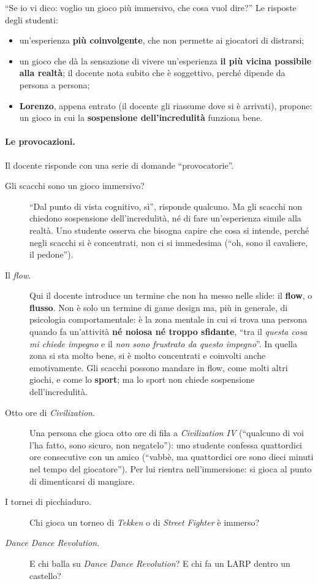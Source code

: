 ``Se io vi dico: voglio un gioco più immersivo, che cosa vuol dire?'' Le
risposte degli studenti:
\begin{itemize}
  \item un'esperienza \textbf{più coinvolgente}, che non permette ai giocatori di
        distrarsi;
  \item un gioco che dà la sensazione di vivere un'esperienza \textbf{il più
        vicina possibile alla realtà}; il docente nota subito che è soggettivo,
        perché dipende da persona a persona;
  \item \textbf{Lorenzo}, appena entrato (il docente gli riassume dove si è
        arrivati), propone: un gioco in cui la \textbf{sospensione
        dell'incredulità} funziona bene.
\end{itemize}

\paragraph{Le provocazioni.} Il docente risponde con una serie di domande
``provocatorie''.
\begin{description}
  \item[Gli scacchi sono un gioco immersivo?] ``Dal punto di vista cognitivo,
        sì'', risponde qualcuno. Ma gli scacchi non chiedono sospensione
        dell'incredulità, né di fare un'esperienza simile alla realtà. Uno
        studente osserva che bisogna capire che cosa si intende, perché negli
        scacchi si è concentrati, non ci si immedesima (``oh, sono il cavaliere,
        il pedone'').
  \item[Il \emph{flow}.] Qui il docente introduce un termine che non ha messo
        nelle slide: il \textbf{flow}, o \textbf{flusso}. Non è solo un termine
        di game design ma, più in generale, di psicologia comportamentale: è
        la zona mentale in cui si trova una persona quando fa un'attività
        \textbf{né noiosa né troppo sfidante}, ``tra il \emph{questa cosa mi chiede
        impegno} e il \emph{non sono frustrato da questo impegno}''. In quella zona
        si sta molto bene, si è molto concentrati e coinvolti anche
        emotivamente. Gli scacchi possono mandare in flow, come molti altri
        giochi, e come lo \textbf{sport}; ma lo sport non chiede sospensione
        dell'incredulità.
  \item[Otto ore di \emph{Civilization}.] Una persona che gioca otto ore di fila a
        \emph{Civilization IV} (``qualcuno di voi l'ha fatto, sono sicuro, non
        negatelo''): uno studente confessa quattordici ore consecutive con un
        amico (``vabbè, ma quattordici ore sono dieci minuti nel tempo del
        giocatore''). Per lui rientra nell'immersione: si gioca al punto di
        dimenticarsi di mangiare.
  \item[I tornei di picchiaduro.] Chi gioca un torneo di \emph{Tekken} o di
        \emph{Street Fighter} è immerso?
  \item[\emph{Dance Dance Revolution}.] E chi balla su \emph{Dance Dance
        Revolution}? E chi fa un LARP dentro un castello?
\end{description}

